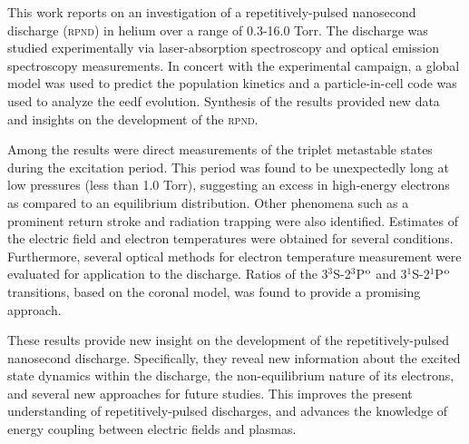 This work reports on an investigation of a repetitively-pulsed nanosecond
discharge (\textsc{rpnd}) in helium over a range of 0.3-16.0 Torr. The discharge
was studied experimentally via laser-absorption spectroscopy and optical
emission spectroscopy measurements. In concert with the experimental campaign, a
global model was used to predict the population kinetics and a particle-in-cell
code was used to analyze the \acs{eedf} evolution. Synthesis of the results
provided new data and insights on the development of the \textsc{rpnd}.

Among the results were direct measurements of the triplet metastable states
during the excitation period. This period was found to be unexpectedly long at
low pressures (less than 1.0 Torr), suggesting an excess in high-energy
electrons as compared to an equilibrium distribution. Other phenomena such as a
prominent return stroke and radiation trapping were also identified. Estimates
of the electric field and electron temperatures were obtained for several
conditions. Furthermore, several optical methods for electron temperature
measurement were evaluated for application to the discharge. Ratios of the
3$^3$S-2$^3$P$^\mathrm{o}$ and 3$^1$S-2$^1$P$^\mathrm{o}$ transitions, based on the coronal
model, was found to provide a promising approach.

These results provide new insight on the development of the repetitively-pulsed
nanosecond discharge. Specifically, they reveal new information about the
excited state dynamics within the discharge, the non-equilibrium nature of its
electrons, and several new approaches for future studies. This improves the
present understanding of repetitively-pulsed discharges, and advances the
knowledge of energy coupling between electric fields and plasmas.
